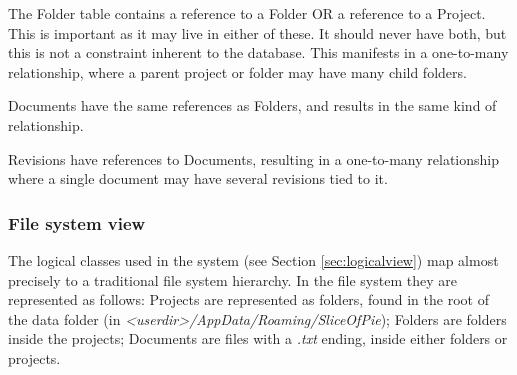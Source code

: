 The Folder table contains a reference to a Folder OR a reference to a Project. This is important as
it may live in either of these. It should never have both, but this is not a constraint inherent to
the database. This manifests in a one-to-many relationship, where a parent project or folder may have
many child folders.

Documents have the same references as Folders, and results in the same kind of relationship.

Revisions have references to Documents, resulting in a one-to-many relationship where a single document
may have several revisions tied to it.

\subsubsection{File system view}
The logical classes used in the system (see Section \ref{sec:logicalview}) map almost precisely to a
traditional file system hierarchy. In the file system they are represented as follows: Projects are
represented as folders, found in the root of the data folder (in \emph{<userdir>/AppData/Roaming/SliceOfPie});
Folders are folders inside the projects; Documents are files with a \emph{.txt} ending, inside either folders
or projects.
